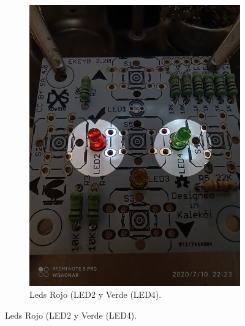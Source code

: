 \documentclass{article}
\begin{document}
\begin{figure}[H]
\begin{subfigure}[t]{0.3\textwidth}
        \includegraphics[width=0.9\columnwidth, height=1.2\columnwidth]{images/Botonera/led2.jpg}
        \caption{Leds Rojo (LED2 y Verde (LED4).}
        \label{fig:botonera_led2}
    \end{subfigure}
     

\end{figure}
\end{document}
